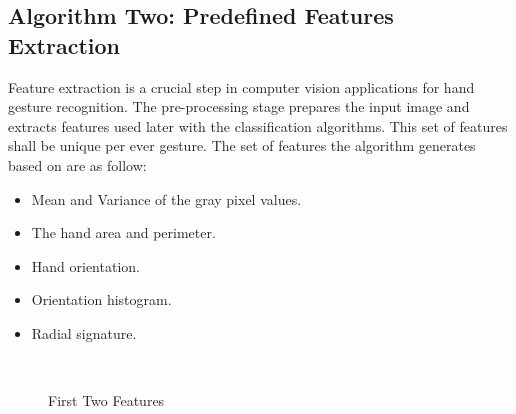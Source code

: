 \subsection{Algorithm Two: Predefined Features Extraction}
Feature extraction is a crucial step in computer vision applications for hand gesture recognition. The pre-processing stage prepares the input image and extracts features used later with the classification algorithms. This set of features shall be unique per ever gesture. The set of features the algorithm generates based on \cite{paper2sT} are as follow:
\bigskip
\begin{itemize}
\item Mean and Variance of the gray pixel values.
\item The hand area and perimeter.
\item Hand orientation.
\item Orientation histogram.
\item Radial signature.
\end{itemize}
\bigskip
\begin{figure}[h]
\begin{dBox}
\centering
  \mbox{
   }
   \caption{First Two Features \cite{paper2sT} \label{fig:mean_area} }   
\end{dBox}   
\end{figure}
